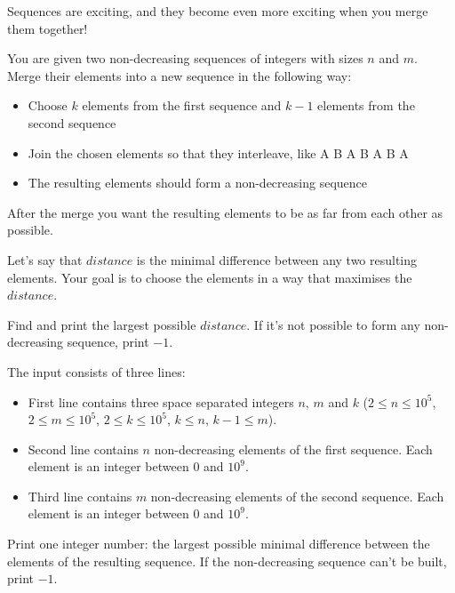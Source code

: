 \problemname{\problemyamlname}


\newcommand{\minn}{2}
\newcommand{\maxn}{10^{5}}
\newcommand{\minm}{2}
\newcommand{\maxm}{10^{5}}
\newcommand{\mink}{2}
\newcommand{\maxk}{10^{5}}
\newcommand{\mina}{0}
\newcommand{\maxa}{10^{9}}

Sequences are exciting, and they become even more exciting when you merge them together!

You are given two non-decreasing sequences of integers with sizes $n$ and $m$. Merge their elements into a new sequence in the following way:
\begin{itemize}
    \item Choose $k$ elements from the first sequence and $k-1$ elements from the second sequence
    \item Join the chosen elements so that they interleave, like A B A B A B A
    \item The resulting elements should form a non-decreasing sequence
\end{itemize}

After the merge you want the resulting elements to be as far from each other as possible.

Let's say that $distance$ is the minimal difference between any two resulting elements. Your goal is to choose the elements in a way that maximises the $distance$.

Find and print the largest possible $distance$. If it's not possible to form any non-decreasing sequence, print $-1$.

\begin{Input}
    The input consists of three lines:
    \begin{itemize}
        \item First line contains three space separated integers $n$, $m$ and $k$ ($\minn \leq n\leq \maxn$, $\minm \leq m\leq \maxm$, $\mink \leq k\leq \maxk$, $k \leq n$, $k-1 \leq m$).
        \item Second line contains $n$ non-decreasing elements of the first sequence. Each element is an integer between $\mina$ and $\maxa$.
        \item Third line contains $m$ non-decreasing elements of the second sequence. Each element is an integer between $\mina$ and $\maxa$.
    \end{itemize}
\end{Input}

\begin{Output}
    Print one integer number: the largest possible minimal difference between the elements of the resulting sequence. If the non-decreasing sequence can't be built, print $-1$.
\end{Output}
